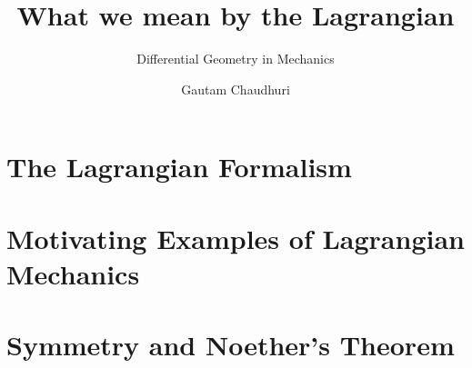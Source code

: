 \documentclass[noamsthm]{beamer}
\author{Gautam Chaudhuri}
\title{What we mean by the Lagrangian}
\subtitle{Differential Geometry in Mechanics}
\begin{document}
\frame{\titlepage}

\section[Lagrange]{The Lagrangian Formalism}

\section[Examples]{Motivating Examples of Lagrangian Mechanics}

\section[Symmetry]{Symmetry and Noether's Theorem}

\end{document}

